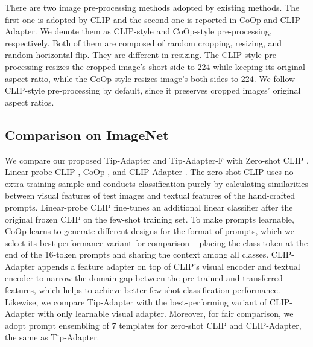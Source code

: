 \documentclass[10pt,twocolumn,letterpaper]{article}
\begin{document}
There are two image pre-processing methods adopted by existing methods. The first one is adopted by CLIP and the second one is reported in CoOp and CLIP-Adapter. We denote them as CLIP-style and CoOp-style pre-processing, respectively. Both of them are composed of random cropping, resizing, and random horizontal flip. They are different in resizing. The CLIP-style pre-processing resizes the cropped image's short side to 224 while keeping its original aspect ratio, while the CoOp-style resizes image's both sides to 224. We follow CLIP-style pre-processing by default, since it preserves cropped images' original aspect ratios.



\subsection{Comparison on ImageNet}

We compare our proposed Tip-Adapter and Tip-Adapter-F with {Zero-shot CLIP} \cite{radford2021learning}, {Linear-probe CLIP} \cite{radford2021learning}, {CoOp} \cite{zhou2021coop}, and {CLIP-Adapter} \cite{gao2021clip}. The zero-shot CLIP uses no extra training sample and conducts classification purely by calculating similarities between visual features of test images and textual features of the hand-crafted prompts. Linear-probe CLIP fine-tunes an additional linear classifier after the original frozen CLIP on the few-shot training set. To make prompts learnable, CoOp learns to generate different designs for the format of prompts, which we select its best-performance variant for comparison -- placing the class token at the end of the 16-token prompts and sharing the context among all classes. CLIP-Adapter appends a feature adapter \cite{houlsby2019parameter} on top of CLIP's visual encoder and textual encoder to narrow the domain gap between the pre-trained and transferred features, which helps to achieve better few-shot classification performance. Likewise, we compare Tip-Adapter with the best-performing variant of CLIP-Adapter with only learnable visual adapter. Moreover, for fair comparison, we adopt prompt ensembling of 7 templates for zero-shot CLIP and CLIP-Adapter, the same as Tip-Adapter.
\end{document}
